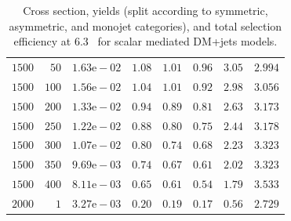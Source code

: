 \begin{table}
{\begin{tabular}{rrlrrrrr}
    $1500$ & $50$ & $1.63\text{e}-02$ & $1.08$ & $1.01$ & $0.96$ & $3.05$ & $2.994$ \\
    $1500$ & $100$ & $1.56\text{e}-02$ & $1.04$ & $1.01$ & $0.92$ & $2.98$ & $3.056$ \\
    $1500$ & $200$ & $1.33\text{e}-02$ & $0.94$ & $0.89$ & $0.81$ & $2.63$ & $3.173$ \\
    $1500$ & $250$ & $1.22\text{e}-02$ & $0.88$ & $0.80$ & $0.75$ & $2.44$ & $3.178$ \\
    $1500$ & $300$ & $1.07\text{e}-02$ & $0.80$ & $0.74$ & $0.68$ & $2.23$ & $3.323$ \\
    $1500$ & $350$ & $9.69\text{e}-03$ & $0.74$ & $0.67$ & $0.61$ & $2.02$ & $3.323$ \\
    $1500$ & $400$ & $8.11\text{e}-03$ & $0.65$ & $0.61$ & $0.54$ & $1.79$ & $3.533$ \\
    $2000$ & $1$ & $3.27\text{e}-03$ & $0.20$ & $0.19$ & $0.17$ & $0.56$ & $2.729$ \\
    \hline\hline
    \end{tabular}
    }
    \caption{Cross section, yields (split according to symmetric, asymmetric, 
        and monojet categories), and total selection efficiency at $6.3$~\ifb 
        for scalar mediated DM+jets models.}
    \label{tab:DMS_yld}
\end{table}


